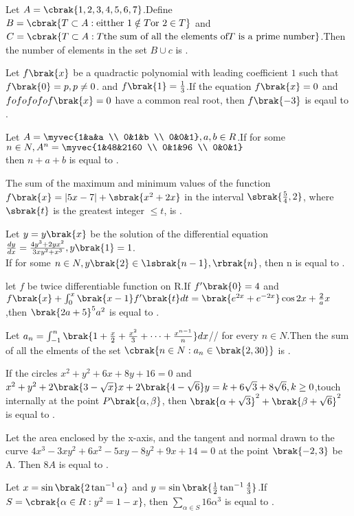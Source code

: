 
\iffalse
  \title{2022}
  \author{Murra Rajesh Kumar Reddy}
  \section{integer}
\fi
    \item Let $A = \cbrak{1,2,3,4,5,6,7}$.Define $B = \cbrak{T \subset A : \text{eitther } 1 \notin T \text{or } 2 \in T}$ and $C = \cbrak{T \subset A : T \text{the sum of all the elements of} T \text{ is a prime number}}$.Then the number of elements in the set $B \cup c$ is .
\item Let $f\brak{x}$ be a quadractic polynomial with leading coefficient $1$ such that $f\brak{0} = p,p \neq 0$. and $f\brak{1}=\frac{1}{3}$.If the equation $f\brak{x}=0$ and $fo fo fo fo f\brak{x} = 0$ have a common real root, then $f\brak{-3}$ is eqaul to .
\item Let $A = \myvec{1&a&a \\ 0&1&b \\ 0&0&1} ,a,b \in R$.If for some $n\in N,A^n = \myvec{1&48&2160 \\ 0&1&96 \\ 0&0&1}$ \\
then $n+a+b$ is equal to .
\item The sum of the maximum and minimum values of the function $f\brak{x} = |5x-7| + \sbrak{x^2+2x}$ in the interval $\sbrak{\frac{5}{4},2}$, where $\sbrak{t}$ is the greatest integer $\leq t$, is .
\item Let $y=y\brak{x}$ be the solution of the differential equation \\
$\frac{dy}{dx} = \frac{4y^3+2yx^2}{3xy^2+x^3},y\brak{1}=1$. \\
If for some $n \in N, y\brak{2} \in \lsbrak{n-1},\rbrak{n}$, then n is equal to .
\item let $f$ be twice differentiable function on R.If $f'\brak{0} = 4$ and ${f\brak{x}+ \int_{0}^{x} \brak{x-1}f'\brak{t}dt =  \brak{e^{2x} + e^{-2x}}\cos{2x} + \frac{2}{a} x}$,then $\brak{2a+5}^5a^2$ is equal to .
\item Let $a_n=\int_{-1}^{n}\brak{1+\frac{x}{2}+\frac{x^2}{3}+\dots+\frac{x^{n-1}}{n}}dx$//
for every $n \in N$.Then the sum of all the elments of the set $\cbrak{n \in N: a_n \in \brak{2,30}}$ is .
\item If the circles $x^2+y^2+6x+8y+16=0$ and ${x^2+y^2+2\brak{3-\sqrt{x}}x+2\brak{4-\sqrt{6}}y = k+6\sqrt{3} +8\sqrt{6},k\ge 0}$,touch internally at the point 
$P\brak{\alpha,\beta}$, then $\brak{\alpha+\sqrt{3}}^2+\brak{\beta+\sqrt{6}}^2$ is equal to .
\item Let the area enclosed by the x-axis, and the tangent and normal drawn to the curve $4x^3-3xy^2+6x^2-5xy-8y^2+9x+14 = 0$ at the point $\brak{-2,3}$ be A. Then $8A$ is equal to .
\item Let $x=\sin\brak{2\tan^{-1}\alpha}$ and $y=\sin\brak{\frac{1}{2}\tan^{-1}\frac{4}{3}}$.If ${S=\cbrak{\alpha \in R : y^2=1-x}}$, then ${\sum_{\alpha \in S} 16\alpha^3}$ is equal to .


